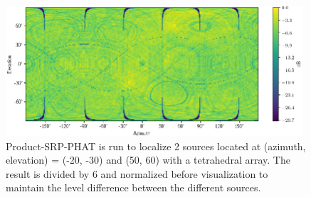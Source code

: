 \begin{figure}[h]
    \centering
    \includegraphics[width=0.98\textwidth]{Figures/4mic2srcNeg6ProdDiv.png}
    \caption{Product-SRP-PHAT is run to localize 2 sources located at (azimuth, elevation) = (-20, -30) and (50, 60) with a tetrahedral array. The result is divided by 6 and normalized before visualization to maintain the level difference between the different sources.}
    \label{fig:4mic2srcNoisyDiv}
\end{figure}